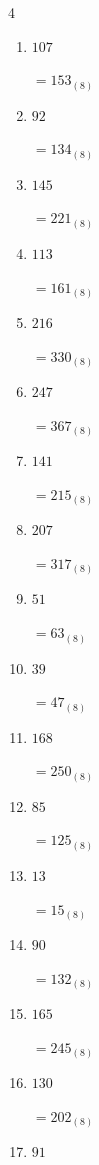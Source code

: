 \begin{multicols}{4}
\begin{enumerate}
  \item $107$

        $=153_{(8)}$

  \item $92$

        $=134_{(8)}$

  \item $145$

        $=221_{(8)}$

  \item $113$

        $=161_{(8)}$

  \item $216$

        $=330_{(8)}$

  \item $247$

        $=367_{(8)}$

  \item $141$

        $=215_{(8)}$

  \item $207$

        $=317_{(8)}$

  \item $51$

        $=63_{(8)}$

  \item $39$

        $=47_{(8)}$

\columnbreak %

  \item $168$

        $=250_{(8)}$

  \item $85$

        $=125_{(8)}$

  \item $13$

        $=15_{(8)}$

  \item $90$

        $=132_{(8)}$

  \item $165$

        $=245_{(8)}$

  \item $130$

        $=202_{(8)}$

  \item $91$


\end{enumerate}
\end{multicols}
